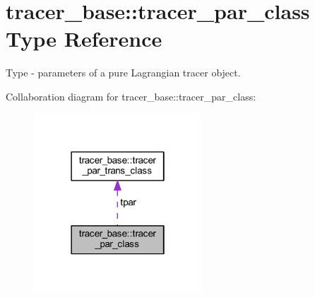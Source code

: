 \hypertarget{structtracer__base_1_1tracer__par__class}{}\section{tracer\+\_\+base\+:\+:tracer\+\_\+par\+\_\+class Type Reference}
\label{structtracer__base_1_1tracer__par__class}


Type -\/ parameters of a pure Lagrangian tracer object.  




Collaboration diagram for tracer\+\_\+base\+:\+:tracer\+\_\+par\+\_\+class\+:
\nopagebreak
\begin{figure}[H]
\begin{center}
\leavevmode
\includegraphics[width=178pt]{structtracer__base_1_1tracer__par__class__coll__graph}
\end{center}
\end{figure}
